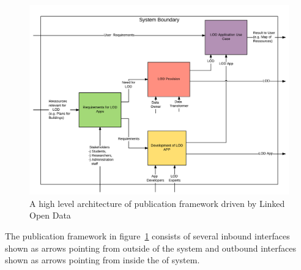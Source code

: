 \documentclass{article}
\begin{document}
\begin{figure}[H]
	\centering \includegraphics*[width=.8\columnwidth]{lod_architecture.png}
	\caption{A high level architecture of publication framework driven by Linked Open Data}
	\label{fig:lod-architecture}
\end{figure}
The publication framework in figure~\ref{fig:lod-architecture} consists of several inbound interfaces shown as arrows pointing from outside of the system and outbound interfaces shown as arrows pointing from inside the of system.
\end{document}
